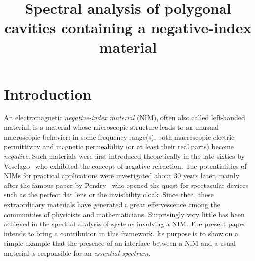 \documentclass[AHL,Unicode,longabstracts]{cedram}
\title[Spectral analysis of polygonal cavities containing a NIM]{Spectral analysis of polygonal cavities containing a negative-index material}
\author{\firstname{Christophe} \lastname{Hazard}}
\author{\firstname{Sandrine} \lastname{Paolantoni}}
\begin{document}
\maketitle

\section{Introduction}\label{s-intro}
An electromagnetic \emph{negative-index material} (NIM), often also called left-handed material, is a material whose microscopic structure leads to an unusual macroscopic behavior: in some frequency range(s), both macroscopic electric permittivity and magnetic permeability (or at least their real parts) become \emph{negative}. Such materials were first introduced theoretically in the late sixties by Veselago~\cite{Ves-68} who exhibited the concept of negative refraction. The potentialities of NIMs for practical applications were investigated about 30 years later, mainly after the famous paper by Pendry~\cite{Pen-00} who opened the quest for spectacular devices such as the perfect flat lens or the invisibility cloak. Since then, these extraordinary materials have generated a great effervescence among the communities of physicists and mathematicians. Surprisingly very little has been achieved in the spectral analysis of systems involving a NIM. The present paper intends to bring a contribution in this framework. Its purpose is to show on a simple example that the presence of an interface between a NIM and a usual material is responsible for an \emph{essential spectrum}.
\end{document}
